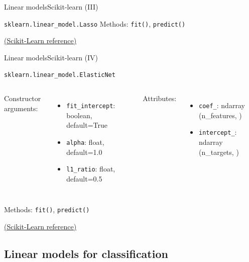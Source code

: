 \documentclass[10pt,compress]{beamer} %
\begin{document}
{\begin{frame}{Linear models}{Scikit-learn (III)}
\begin{exampleblock}{\texttt{sklearn.linear\_model.Lasso}}
            Methods: \texttt{fit()}, \texttt{predict()}
        \end{exampleblock}

        \medskip
        \centering \href{https://scikit-learn.org/stable/modules/generated/sklearn.linear_model.Lasso.html}{(Scikit-Learn reference)}
    \end{frame}

    \begin{frame}{Linear models}{Scikit-learn (IV)}
        \begin{exampleblock}{\texttt{sklearn.linear\_model.ElasticNet}}
         \medskip

         \begin{columns}[T]
                Constructor arguments:
                \begin{itemize}
                    \item \texttt{fit\_intercept}: boolean, default=True
                    \item \texttt{alpha}: float, default=1.0
                    \item \texttt{l1\_ratio}: float, default=0.5
                \end{itemize}

                Attributes:
                \begin{itemize}
                    \item \texttt{coef\_}:  ndarray (n\_features, )
                    \item \texttt{intercept\_}:  ndarray (n\_targets, )
                \end{itemize}
            \end{columns}

            \medskip

            Methods: \texttt{fit()}, \texttt{predict()}
        \end{exampleblock}

        \medskip
        \centering \href{https://scikit-learn.org/stable/modules/generated/sklearn.linear_model.ElasticNet.html}{(Scikit-Learn reference)}
    \end{frame}
}{}


\subsection{Linear models for classification}
\end{document}
